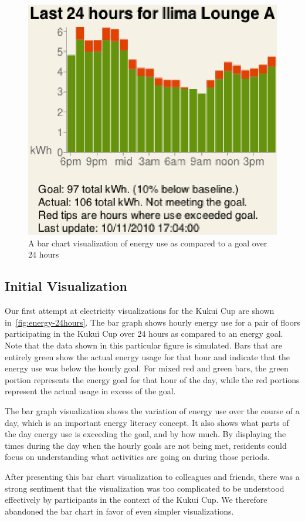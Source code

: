 \documentclass{sigchi}
\begin{document}
\begin{figure}[!t]
\centering
\includegraphics[width=0.7\columnwidth]{energy-24hours-new.eps}
\caption{A bar chart visualization of energy use as compared to a goal over 24 hours}
\label{fig:energy-24hours}
\end{figure}

\subsection{Initial Visualization}
Our first attempt at electricity visualizations for the Kukui Cup are shown in~\autoref{fig:energy-24hours}. The bar graph shows hourly energy use for a pair of floors participating in the Kukui Cup over 24 hours as compared to an energy goal. Note that the data shown in this particular figure is simulated. Bars that are entirely green show the actual energy usage for that hour and indicate that the energy use was below the hourly goal. For mixed red and green bars, the green portion represents the energy goal for that hour of the day, while the red portions represent the actual usage in excess of the goal.

The bar graph visualization shows the variation of energy use over the course of a day, which is an important energy literacy concept. It also shows what parts of the day energy use is exceeding the goal, and by how much. By displaying the times during the day when the hourly goals are not being met, residents could focus on understanding what activities are going on during those periods.

After presenting this bar chart visualization to colleagues and friends, there was a strong sentiment that the visualization was too complicated to be understood effectively by participants in the context of the Kukui Cup. We therefore abandoned the bar chart in favor of even simpler visualizations.
\end{document}
